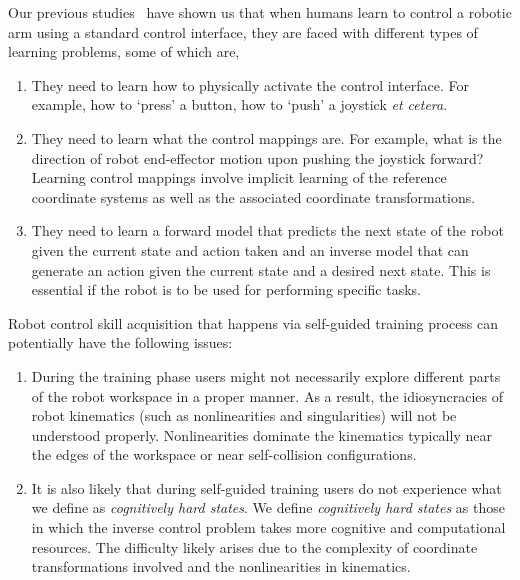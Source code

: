 \documentclass[12pt]{article}
\begin{document}
Our previous studies~\cite{gopinath2017human, gopinath2017mode} have shown us that when humans learn to control a robotic arm using a standard control interface, they are faced with different types of learning problems, some of which are,
\begin{enumerate}
	\item They need to learn how to physically activate the control interface. For example, how to `press' a button, how to `push' a joystick \textit{et cetera}.
	\item They need to learn what the control mappings are. For example, what is the direction of robot end-effector motion upon pushing the joystick forward? Learning control mappings involve implicit learning of the reference coordinate systems as well as the associated coordinate transformations. 
	\item They need to learn a forward model that predicts the next state of the robot given the current state and action taken and an inverse model that can generate an action given the current state and a desired next state. This is essential if the robot is to be used for performing specific tasks. 
\end{enumerate}
Robot control skill acquisition that happens via self-guided training process can potentially have the following issues:
\begin{enumerate}
	\item During the training phase users might not necessarily explore different parts of the robot workspace in a proper manner. As a result, the idiosyncracies of robot kinematics (such as nonlinearities and singularities) will not be understood properly. Nonlinearities dominate the kinematics typically near the edges of the workspace or near self-collision configurations. 
	\item It is also likely that during self-guided training users do not experience what we define as \textit{cognitively hard states}. We define \textit{cognitively hard states} as those in which the inverse control problem takes more cognitive and computational resources. The difficulty likely arises due to the complexity of coordinate transformations involved and the nonlinearities in kinematics. 
\end{enumerate}

\end{document}
